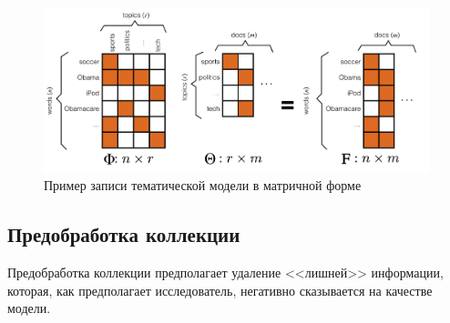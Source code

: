 \documentclass[a4paper, 14pt]{extarticle}
\begin{document}
	\begin{figure}
			\centering \includegraphics[scale=0.25]{img/tm} 
			\caption{Пример записи тематической модели в матричной форме \cite{CatalinVoss14}}
			\label{pic2}
	\end{figure}
   	
   	\subsection{Предобработка коллекции}
   	\label{pros_coll}
   	Предобработка коллекции предполагает удаление <<лишней>> информации, которая, как предполагает исследователь, негативно сказывается на качестве модели. 
   	
\end{document}

